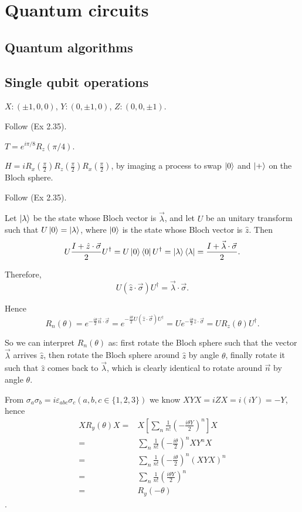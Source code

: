 \chapter{Quantum circuits}

\section{Quantum algorithms}

\section{Single qubit operations}

\ex $X:(\pm 1,0,0)$, $Y:(0,\pm 1,0)$, $Z:(0,0,\pm 1)$.

\ex Follow (Ex 2.35).

\ex $T=e^{i\pi/8}R_z(\pi/4)$.

\ex $H=iR_x(\frac{\pi}{2})R_z(\frac{\pi}{2})R_x(\frac{\pi}{2})$, by imaging a process to swap $\left|0\right\rangle$ and $\left|+\right\rangle$ on the Bloch sphere.

\ex Follow (Ex 2.35).

\ex Let $\left|\lambda\right\rangle$ be the state whose Bloch vector is $\vec{\lambda}$, and let $U$ be an unitary transform such that $U\left|0\right\rangle = \left|\lambda\right\rangle$, where $\left|0\right\rangle$ is the state whose Bloch vector is $\hat{z}$.
Then 
$$U\frac{I+\hat{z}\cdot\vec{\sigma}}{2}U^\dagger = U\left|0\right\rangle\left\langle0\right|U^\dagger = \left|\lambda\right\rangle\left\langle\lambda\right| = \frac{I+\vec{\lambda}\cdot\vec{\sigma}}{2}.$$

Therefore,
$$U(\hat{z}\cdot\vec{\sigma})U^\dagger = \vec{\lambda}\cdot\vec{\sigma}.$$

Hence
$$R_n(\theta) = e^{-\frac{i\theta}{2}\vec{n}\cdot\vec{\sigma}} = e^{-\frac{i\theta}{2}U(\hat{z}\cdot\vec{\sigma})U^\dagger} = Ue^{-\frac{i\theta}{2}\hat{z}\cdot\vec{\sigma}} = UR_z(\theta)U^\dagger.$$

So we can interpret $R_n(\theta)$ as: first rotate the Bloch sphere such that the vector $\vec{\lambda}$ arrives $\hat{z}$, then rotate the Bloch sphere around $\hat{z}$ by angle $\theta$, finally rotate it such that $\hat{z}$ comes back to $\vec{\lambda}$, which is clearly identical to rotate around $\vec{n}$ by angle $\theta$.

\ex From $\sigma_a\sigma_b=i\varepsilon_{abc}\sigma_c(a,b,c\in\{1,2,3\})$ we know $XYX=iZX=i(iY)=-Y$, hence
$$\begin{aligned}
    XR_y(\theta)X=&X\left[\sum_n\frac{1}{n!}\left(-\frac{i\theta Y}{2}\right)^n\right]X
    \\=&\sum_n\frac{1}{n!}\left(-\frac{i\theta}{2}\right)^nXY^nX
    \\=&\sum_n\frac{1}{n!}\left(-\frac{i\theta}{2}\right)^n(XYX)^n
    \\=&\sum_n\frac{1}{n!}\left(\frac{i\theta Y}{2}\right)^n
    \\=&R_y(-\theta)\end{aligned}$$.

